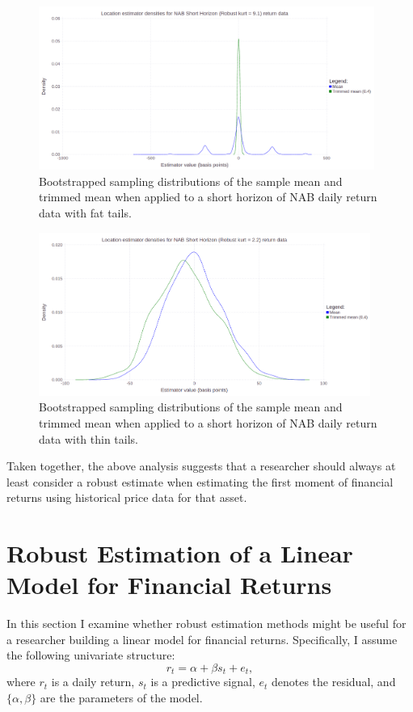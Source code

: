 \documentclass[12pt,a4paper]{amsart}
\renewcommand{\a}{\alpha}
\renewcommand{\b}{\beta}
\begin{document}
\begin{figure}[htbp]
\centering
\includegraphics[height=5.35cm]{NABTrimMeanShortFat.png}
\caption{\footnotesize{Bootstrapped sampling distributions of the sample mean and trimmed mean when applied to a short horizon of NAB daily return data with fat tails.}}
\label{figNABTrimMeanShortFat}
\end{figure}

\begin{figure}[htbp]
\centering
\includegraphics[height=5.35cm]{NABTrimMeanShortThin.png}
\caption{\footnotesize{Bootstrapped sampling distributions of the sample mean and trimmed mean when applied to a short horizon of NAB daily return data with thin tails.}}
\label{figNABTrimMeanShortThin}
\end{figure}




Taken together, the above analysis suggests that a researcher should always at least consider a robust estimate when estimating the first moment of financial returns using historical price data for that asset.


\newpage

\section{Robust Estimation of a Linear Model for Financial Returns}\label{secFinReturnLinearModel}

In this section I examine whether robust estimation methods might be useful for a researcher building a linear model for financial returns. Specifically, I assume the following univariate structure:
\begin{equation}\label{retModel}
r_t = \a + \b s_t + e_t ,
\end{equation}
where $r_t$ is a daily return, $s_t$ is a predictive signal, $e_t$ denotes the residual, and $\{\a, \b\}$ are the parameters of the model.
\end{document}
